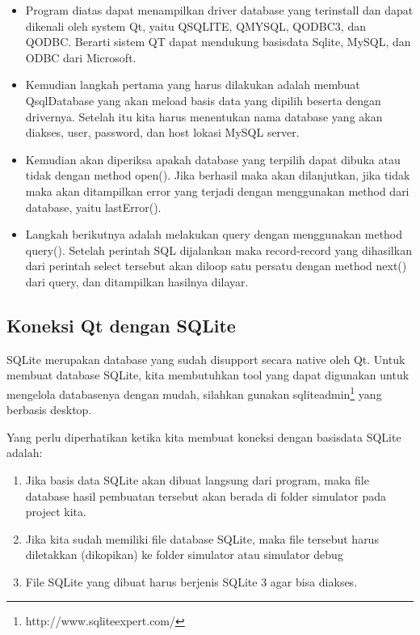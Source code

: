 \begin{itemize}

\item
Program diatas dapat menampilkan driver database yang terinstall dan
dapat dikenali oleh system Qt, yaitu QSQLITE, QMYSQL, QODBC3, dan
QODBC. Berarti sistem QT dapat mendukung basisdata Sqlite, MySQL, dan
ODBC dari Microsoft.
\item
Kemudian langkah pertama yang harus dilakukan adalah membuat
QsqlDatabase yang akan meload basis data yang dipilih beserta dengan
drivernya. Setelah itu kita harus menentukan nama database yang akan
diakses, user, password, dan host lokasi MySQL server.
\item
Kemudian akan diperiksa apakah database yang terpilih dapat dibuka
atau tidak dengan method open(). Jika berhasil maka akan dilanjutkan,
jika tidak maka akan ditampilkan error yang terjadi dengan menggunakan
method dari database, yaitu lastError().
\item
Langkah berikutnya adalah melakukan query dengan menggunakan method
query(). Setelah perintah SQL dijalankan maka record-record yang
dihasilkan dari perintah select tersebut akan diloop satu persatu
dengan method next() dari query, dan ditampilkan hasilnya dilayar.
\end{itemize}

\subsection{Koneksi Qt dengan SQLite}\label{koneksi-qt-dengan-sqlite}

SQLite merupakan database yang sudah disupport secara native oleh Qt.
Untuk membuat database SQLite, kita membutuhkan tool yang dapat
digunakan untuk mengelola databasenya dengan mudah, silahkan gunakan
sqliteadmin\footnote{http://www.sqliteexpert.com/} yang berbasis desktop.

Yang perlu diperhatikan ketika kita membuat koneksi dengan basisdata
SQLite adalah:

\begin{enumerate}


\item
Jika basis data SQLite akan dibuat langsung dari program, maka file
database hasil pembuatan tersebut akan berada di folder simulator pada
project kita.
\item
Jika kita sudah memiliki file database SQLite, maka file tersebut
harus diletakkan (dikopikan) ke folder simulator atau simulator \textfractionsolidus debug
\item
File SQLite yang dibuat harus berjenis SQLite 3 agar bisa diakses.
\end{enumerate}

